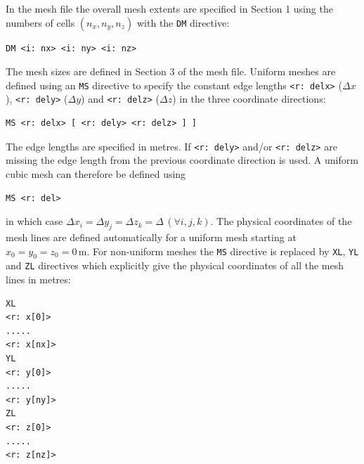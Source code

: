 \documentclass[onecolumn,a4paper]{article}
\numberwithin{equation}{section}
\begin{document}
In the mesh file the overall mesh extents are specified in Section 1
using the numbers of cells $(n_x,n_y,n_z)$ with the \texttt{DM} directive:
\begin{verbatim}
DM <i: nx> <i: ny> <i: nz> 
\end{verbatim}
The mesh sizes are defined in Section 3 of the mesh file.
Uniform meshes are defined using an \texttt{MS} directive to specify the constant edge lengths 
\texttt{<r:~delx>} ($\Delta x$), \texttt{<r:~dely>} ($\Delta y$) and \texttt{<r:~delz>}
($\Delta z$) in the three coordinate directions:
\begin{verbatim}
MS <r: delx> [ <r: dely> <r: delz> ] ]
\end{verbatim} 
The edge lengths are specified in metres. If \texttt{<r:~dely>} and/or \texttt{<r:~delz>} are missing the edge 
length from the previous coordinate direction is used. A uniform cubic mesh can therefore be defined using
\begin{verbatim}
MS <r: del>
\end{verbatim}
in which case $\Delta x_i=\Delta y_j=\Delta z_k=\Delta\,(\forall i,j,k)$. The physical coordinates of the mesh lines are defined automatically 
for a uniform mesh starting at $x_0=y_0=z_0=0$\,m. For non-uniform meshes the \texttt{MS} directive is replaced by \texttt{XL},  \texttt{YL} 
and \texttt{ZL} directives which explicitly give the physical coordinates of all the mesh lines in metres:
\begin{verbatim}
XL 
<r: x[0]>
.....
<r: x[nx]>
YL 
<r: y[0]> 
.....
<r: y[ny]>
ZL
<r: z[0]> 
.....
<r: z[nz]>
\end{verbatim}

\end{document}
